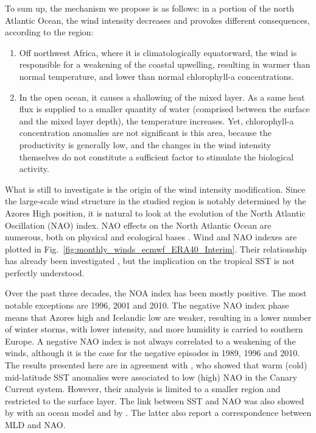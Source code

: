 \documentclass[12pt]{article}
\begin{document}
To sum up, the mechanism we propose is as follows: in a portion of the north Atlantic Ocean, the wind intensity decreases and provokes different consequences, according to the region:

\begin{enumerate}
\item Off northwest Africa, where it is climatologically equatorward, the wind is responsible for a weakening of the coastal upwelling, resulting in warmer than normal temperature, and lower than normal chlorophyll-a concentrations.
\item In the open ocean, it causes a shallowing of the mixed layer. As a same heat flux is supplied to a smaller quantity of water (comprised between the surface and the mixed layer depth), the temperature increases. Yet, chlorophyll-a concentration anomalies are not significant is this area, because the productivity is generally low, and the changes in the wind intensity themselves do not constitute a sufficient factor to stimulate the biological activity.    
\end{enumerate}

What is still to investigate is the origin of the wind intensity modification. Since the large-scale wind structure in the studied region is notably determined by the Azores High position, it is natural to look at the evolution of the North Atlantic Oscillation (NAO) index. NAO effects on the North Atlantic Ocean are numerous, both on physical \citep{WANNER01,MARSHALL02,HURREL09} and ecological bases \citep{OTTERSEN01}. Wind and NAO indexes are plotted in Fig.~\ref{fig:monthly_winds_ecmwf_ERA40_Interim}. Their relationship has already been investigated \citep[e.g.][]{HURREL95,MARSHALL01}, but the implication on the tropical SST is not perfectly understood.

Over the past three decades, the NOA index has been mostly positive. The most notable exceptions are 1996, 2001 and 2010. The negative NAO index phase means that Azores high and Icelandic low are weaker, resulting in a lower number of winter storms, with lower intensity, and more humidity is carried to southern Europe. A negative NAO index is not always correlated to a weakening of the winds, although it is the case for the negative episodes in 1989, 1996 and 2010. The results presented here are in agreement with \cite{SANTOS05}, who showed that warm (cold) mid-latitude SST anomalies were associated to low (high) NAO in the Canary Current system. However, their analysis is limited to a smaller region and restricted to the surface layer. The link between SST and NAO was also showed by \cite{VISBECK98} with an ocean model and by \cite{HURREL09}. The latter also report a correspondence between MLD and NAO.
\end{document}
